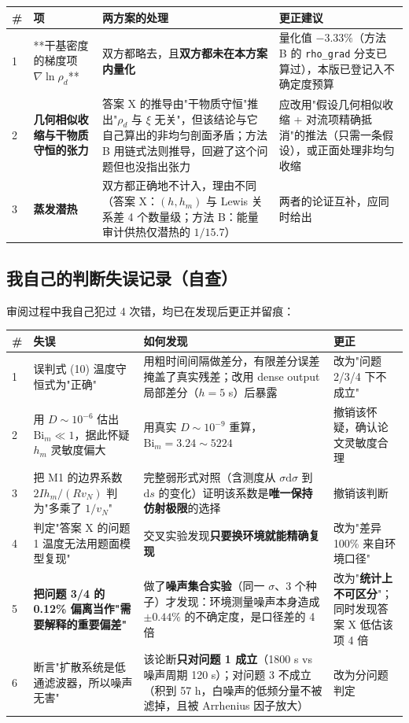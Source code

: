 \begin{center}
\small
\begin{tabular}{llll}
\toprule
\# & 项 & 两方案的处理 & 更正建议 \\
\midrule
1 & **干基密度的梯度项 $\nabla\ln\rho_d$** & 双方都略去，且\textbf{双方都未在本方案内量化} & 量化值 $-3.33\%$（方法 B 的 \texttt{rho\_grad} 分支已算过），本版已登记入不确定度预算 \\
2 & \textbf{几何相似收缩与干物质守恒的张力} & 答案 X 的推导由"干物质守恒"推出"$\rho_d$ 与 $\xi$ 无关"，但该结论与它自己算出的非均匀剖面矛盾；方法 B 用链式法则推导，回避了这个问题但也没指出张力 & 应改用"假设几何相似收缩 + 对流项精确抵消"的推法（只需一条假设），或正面处理非均匀收缩 \\
3 & \textbf{蒸发潜热} & 双方都正确地不计入，理由不同（答案 X：$(h,h_m)$ 与 Lewis 关系差 4 个数量级；方法 B：能量审计供热仅潜热的 $1/15.7$） & 两者的论证互补，应同时给出 \\
\bottomrule
\end{tabular}
\end{center}


\subsection{我自己的判断失误记录（自查）}


审阅过程中我自己犯过 4 次错，均已在发现后更正并留痕：


\begin{center}
\small
\begin{tabular}{llll}
\toprule
\# & 失误 & 如何发现 & 更正 \\
\midrule
1 & 误判式 (10) 温度守恒式为"正确" & 用粗时间间隔做差分，有限差分误差掩盖了真实残差；改用 dense output 局部差分（$h=5$ s）后暴露 & 改为"问题 2/3/4 下不成立" \\
2 & 用 $D\sim10^{-6}$ 估出 $\mathrm{Bi}_m\ll1$，据此怀疑 $h_m$ 灵敏度偏大 & 用真实 $D\sim10^{-9}$ 重算，$\mathrm{Bi}_m=3.24\sim5224$ & 撤销该怀疑，确认论文灵敏度合理 \\
3 & 把 M1 的边界系数 $2Ih_m/(Rv_N)$ 判为"多乘了 $1/v_N$" & 完整弱形式对照（含测度从 $\sigma\mathrm d\sigma$ 到 $\mathrm ds$ 的变化）证明该系数是\textbf{唯一保持仿射极限}的选择 & 撤销该判断 \\
4 & 判定"答案 X 的问题 1 温度无法用题面模型复现" & 交叉实验发现\textbf{只要换环境就能精确复现} & 改为"差异 100\% 来自环境口径" \\
5 & \textbf{把问题 3/4 的 0.12\% 偏离当作"需要解释的重要偏差"} & 做了\textbf{噪声集合实验}（同一 $\sigma$、3 个种子）才发现：环境测量噪声本身造成 $\pm0.44\%$ 的不确定度，是口径差的 4 倍 & 改为"\textbf{统计上不可区分}"；同时发现答案 X 低估该项 4 倍 \\
6 & 断言"扩散系统是低通滤波器，所以噪声无害" & 该论断\textbf{只对问题 1 成立}（1800 s vs 噪声周期 120 s）；对问题 3 不成立（积到 57 h，白噪声的低频分量不被滤掉，且被 Arrhenius 因子放大） & 改为分问题判定 \\
\bottomrule
\end{tabular}
\end{center}


